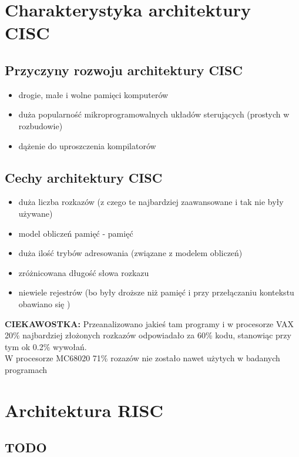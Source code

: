\documentclass[a4paper,twoside]{article}
\begin{document}
\section*{Charakterystyka architektury CISC}
	\subsection*{Przyczyny rozwoju architektury CISC}
    	\begin{itemize}
        \item drogie, małe i wolne pamięci komputerów
        \item duża popularność mikroprogramowalnych układów sterujących (prostych w rozbudowie)
        \item dążenie do uproszczenia kompilatorów
        \end{itemize}
    
    \subsection*{Cechy architektury CISC}
    	\begin{itemize}
        \item duża liczba rozkazów (z czego te najbardziej zaawansowane i tak nie były używane)
        \item model obliczeń pamięć - pamięć
        \item duża ilość trybów adresowania (związane z modelem obliczeń)
        \item zróżnicowana długość słowa rozkazu
        \item niewiele rejestrów (bo były droższe niż pamięć i przy przełączaniu kontekstu obawiano się )
        \end{itemize}
   
   \textbf{\large CIEKAWOSTKA:} Przeanalizowano jakieś tam programy i w procesorze VAX 20\% najbardziej złożonych rozkazów odpowiadało za 60\% kodu, stanowiąc przy tym ok 0.2\% wywołań.\\ W procesorze MC68020 71\% rozazów nie zostało nawet użytych w badanych programach
   
	\section*{Architektura RISC}
   		\subsection*{TODO}
        
\end{document}
